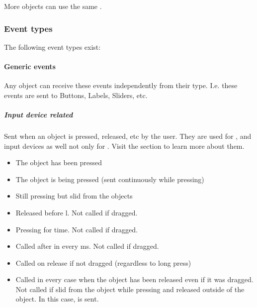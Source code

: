 \documentclass[letterpaper,10pt,english]{sphinxmanual}
\begin{document}
More objects can use the same .


\subsubsection{Event types}
\label{\detokenize{overview/events:event-types}}
The following event types exist:


\paragraph{Generic events}
\label{\detokenize{overview/events:generic-events}}
Any object can receive these events independently from their type. I.e. these events are sent to Buttons, Labels, Sliders, etc.


\subparagraph{Input device related}
\label{\detokenize{overview/events:input-device-related}}
Sent when an object is pressed, released, etc by the user. They are used for ,  and  input devices as well not only for . Visit the {\hyperref[\detokenize{overview/indev::doc}]{}} section to learn more about them.
\begin{itemize}
\item {} 
 The object has been pressed

\item {} 
 The object is being pressed (sent continuously while pressing)

\item {} 
 Still pressing but slid from the objects

\item {} 
 Released before l. Not called if dragged.

\item {} 
  Pressing for  time.  Not called if dragged.

\item {} 
 Called after  in every  ms.  Not called if dragged.

\item {} 
 Called on release if not dragged (regardless to long press)

\item {} 
  Called in every case when the object has been released even if it was dragged. Not called if slid from the object while pressing and released outside of the object. In this case,  is sent.

\end{itemize}
\end{document}
